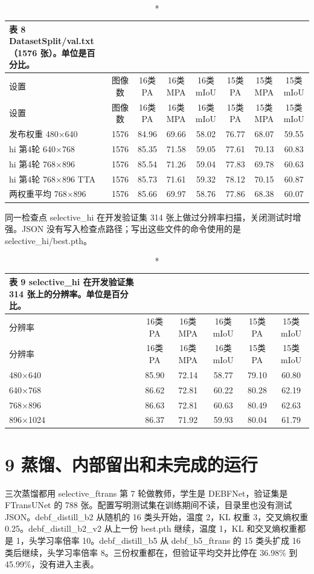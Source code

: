 \documentclass[11pt]{article}
\begin{document}
{\footnotesize\setlength{\tabcolsep}{3pt}
\begin{longtable}{lccccccc}
\caption*{表 8  DatasetSplit/val.txt（1576 张）。单位是百分比。}\\
\toprule
设置 & 图像数 & 16类 PA & 16类 MPA & 16类 mIoU & 15类 PA & 15类 MPA & 15类 mIoU\\
\midrule
\endfirsthead
\toprule
设置 & 图像数 & 16类 PA & 16类 MPA & 16类 mIoU & 15类 PA & 15类 MPA & 15类 mIoU\\
\midrule
\endhead
发布权重 480×640 & 1576 & 84.96 & 69.66 & 58.02 & 76.77 & 68.07 & 59.55\\
hi 第4轮 640×768 & 1576 & 85.35 & 71.58 & 59.05 & 77.61 & 70.13 & 60.83\\
hi 第4轮 768×896 & 1576 & 85.54 & 71.26 & 59.04 & 77.83 & 69.78 & 60.63\\
hi 第4轮 768×896 TTA & 1576 & 85.73 & 71.61 & 59.32 & 78.12 & 70.15 & 60.87\\
两权重平均 768×896 & 1576 & 85.66 & 69.97 & 58.76 & 77.86 & 68.38 & 60.07\\
\bottomrule
\end{longtable}
}
同一检查点 selective\_hi 在开发验证集 314 张上做过分辨率扫描，关闭测试时增强。JSON 没有写入检查点路径；写出这些文件的命令使用的是 selective\_hi/best.pth。

{\footnotesize\setlength{\tabcolsep}{3pt}
\begin{longtable}{lccccc}
\caption*{表 9  selective\_hi 在开发验证集 314 张上的分辨率。单位是百分比。}\\
\toprule
分辨率 & 16类 PA & 16类 MPA & 16类 mIoU & 15类 PA & 15类 mIoU\\
\midrule
\endfirsthead
\toprule
分辨率 & 16类 PA & 16类 MPA & 16类 mIoU & 15类 PA & 15类 mIoU\\
\midrule
\endhead
480×640 & 85.90 & 72.14 & 58.77 & 79.10 & 60.80\\
640×768 & 86.62 & 72.81 & 60.22 & 80.28 & 62.19\\
768×896 & 86.63 & 72.81 & 60.63 & 80.49 & 62.63\\
896×1024 & 86.37 & 71.92 & 59.93 & 80.04 & 61.79\\
\bottomrule
\end{longtable}
}
\section*{9  蒸馏、内部留出和未完成的运行}
三次蒸馏都用 selective\_ftrans 第 7 轮做教师，学生是 DEBFNet，验证集是 FTransUNet 的 788 张。配置写明测试集在训练期间不读，目录里也没有测试 JSON。debf\_distill\_b2 从随机的 16 类头开始，温度 2，KL 权重 3，交叉熵权重 0.25。debf\_distill\_b2\_v2 从上一份 best.pth 继续，温度 1，KL 和交叉熵权重都是 1，头学习率倍率 10。debf\_distill\_b5 从 debf\_b5\_ftrans 的 15 类头扩成 16 类后继续，头学习率倍率 8。三份权重都在，但验证平均交并比停在 36.98\% 到 45.99\%，没有进入主表。
\end{document}

